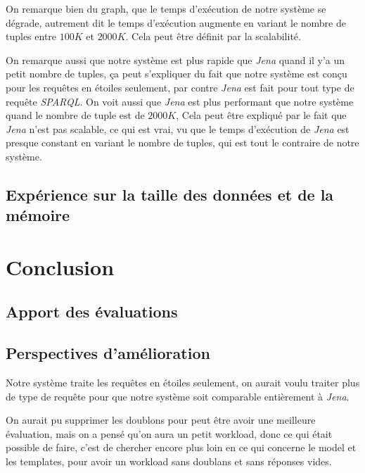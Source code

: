 \documentclass[12pt,titlepage]{article}
\begin{document}
On remarque bien du graph, que le temps d'exécution de notre système se dégrade, autrement dit le temps d'exécution augmente en variant le nombre de tuples entre $100K$ et $2000K$. Cela peut être définit par la scalabilité. 

On remarque aussi que notre système est plus rapide que \textit{Jena} quand il y'a un petit nombre de tuples, ça peut s'expliquer du fait que notre système est conçu pour les requêtes en étoiles seulement, par contre \textit{Jena} est fait pour tout type de requête \textit{SPARQL}. On voit aussi que \textit{Jena} est plus performant que notre système quand le nombre de tuple est de $2000K$, Cela peut être expliqué par le fait que \textit{Jena} n'est pas scalable, ce qui est vrai, vu que le temps d'exécution de \textit{Jena} est presque constant en variant le nombre de tuples, qui est tout le contraire de notre système.

\subsection{Expérience sur la taille des données et de la mémoire}

\section{Conclusion}

\subsection{Apport des évaluations}

\subsection{Perspectives d'amélioration}
Notre système traite les requêtes en étoiles seulement, on aurait voulu traiter plus de type de requête pour que notre système soit comparable entièrement à \textit{Jena}. 

On aurait pu supprimer les doublons pour peut être avoir une meilleure évaluation, mais on a pensé qu'on aura un petit workload, donc ce qui était possible de faire, c'est de chercher encore plus loin en ce qui concerne le model et les templates, pour avoir un workload sans doublans et sans réponses vides. 
\end{document}
